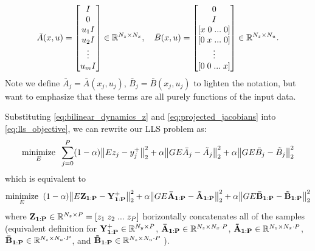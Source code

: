 \documentclass{article}
\begin{document}
\begin{equation}
  \bar{A}(x,u) =  \begin{bmatrix} 
    I \\ 0 \\ u_1 I \\ u_2 I \\ \vdots \\ u_m I 
  \end{bmatrix} \in \mathbb{R}^{N_z \times N_x}, \quad
  \bar{B}(x,u) = \begin{bmatrix} 
    0 \\ 
    I \\ 
    [x \; 0 \; ... \; 0] \\
    [0 \; x \; ... \; 0] \\
    \vdots \\
    [0 \; 0 \; ... \; x] \\
  \end{bmatrix} \in \mathbb{R}^{N_z \times N_u}.
\end{equation}
Note we define $\bar{A}_j = \bar{A}(x_j,u_j)$, $\bar{B}_j = \bar{B}(x_j,u_j)$ to lighten 
the notation, but want to emphasize that these terms are all purely functions of the input
data.

Substituting \eqref{eq:bilinear_dynamics_z} and \eqref{eq:projected_jacobians} into
\eqref{eq:lls_objective}, we can rewrite our LLS problem as:
\begin{align}
  \underset{E}{\text{minimize}} \;\; 
  \sum_{j=0}^P
  (1-\alpha) \norm{E z_j - y_j^+}_2^2 + 
  \alpha  \norm{G E \bar{A}_j - \tilde{A}_j}_2^2 + 
  \alpha  \norm{G E \bar{B}_j - \tilde{B}_j}_2^2 
\end{align}
which is equivalent to
\begin{align} \label{opt:lls_matrices}
  \underset{E}{\text{minimize}} \;\; 
  (1-\alpha) \norm{E \mathbf{Z_{1:P}} - \mathbf{Y^+_{1:P}} }_2^2 + 
  \alpha  \norm{G E \mathbf{\bar{A}_{1:P}} - \mathbf{\tilde{A}_{1:P}}}_2^2 + 
  \alpha  \norm{G E \mathbf{\bar{B}_{1:P}} - \mathbf{\tilde{B}_{1:P}}}_2^2
\end{align}
where $\mathbf{Z_{1:P}} \in \mathbb{R}^{N_z \times P} = [z_1 \; z_2 \; ... \; z_P]$ horizontally
concatenates all of the samples (equivalent definition for 
$\mathbf{Y^+_{1:P}} \in \mathbb{R}^{N_y \times P}$, 
$\mathbf{\bar{A}_{1:P}} \in \mathbb{R}^{N_z \times N_x \cdot P}$, 
$\mathbf{\tilde{A}_{1:P}} \in \mathbb{R}^{N_z \times N_x \cdot P}$,
$\mathbf{\bar{B}_{1:P}} \in \mathbb{R}^{N_z \times N_u \cdot P}$, and 
$\mathbf{\tilde{B}_{1:P}} \in \mathbb{R}^{N_z \times N_u \cdot P}$ ).
\end{document}
